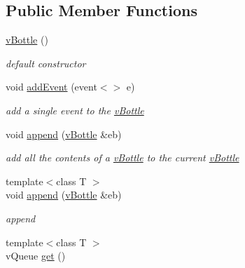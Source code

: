 \subsection*{Public Member Functions}
\begin{DoxyCompactItemize}
\item 
\hyperlink{classev_1_1vBottle_afb002196d4fa9bd19af48be74327cb17}{v\+Bottle} ()\hypertarget{classev_1_1vBottle_afb002196d4fa9bd19af48be74327cb17}{}\label{classev_1_1vBottle_afb002196d4fa9bd19af48be74327cb17}

\begin{DoxyCompactList}\small\item\em default constructor \end{DoxyCompactList}\item 
void \hyperlink{classev_1_1vBottle_a5b17f0b46d9260ab255f38382b4b7268}{add\+Event} (event$<$$>$ e)\hypertarget{classev_1_1vBottle_a5b17f0b46d9260ab255f38382b4b7268}{}\label{classev_1_1vBottle_a5b17f0b46d9260ab255f38382b4b7268}

\begin{DoxyCompactList}\small\item\em add a single event to the \hyperlink{classev_1_1vBottle}{v\+Bottle} \end{DoxyCompactList}\item 
void \hyperlink{classev_1_1vBottle_a0c78e6f9ef839038d71486f6a8a6294a}{append} (\hyperlink{classev_1_1vBottle}{v\+Bottle} \&eb)\hypertarget{classev_1_1vBottle_a0c78e6f9ef839038d71486f6a8a6294a}{}\label{classev_1_1vBottle_a0c78e6f9ef839038d71486f6a8a6294a}

\begin{DoxyCompactList}\small\item\em add all the contents of a \hyperlink{classev_1_1vBottle}{v\+Bottle} to the current \hyperlink{classev_1_1vBottle}{v\+Bottle} \end{DoxyCompactList}\item 
{\footnotesize template$<$class T $>$ }\\void \hyperlink{classev_1_1vBottle_a9ef66f613e1bbf196c515e7d8b0416df}{append} (\hyperlink{classev_1_1vBottle}{v\+Bottle} \&eb)\hypertarget{classev_1_1vBottle_a9ef66f613e1bbf196c515e7d8b0416df}{}\label{classev_1_1vBottle_a9ef66f613e1bbf196c515e7d8b0416df}

\begin{DoxyCompactList}\small\item\em append \end{DoxyCompactList}\item 
{\footnotesize template$<$class T $>$ }\\v\+Queue \hyperlink{classev_1_1vBottle_a86302277c279a1b02d92f8e12afe6a2c}{get} ()\hypertarget{classev_1_1vBottle_a86302277c279a1b02d92f8e12afe6a2c}{}\label{classev_1_1vBottle_a86302277c279a1b02d92f8e12afe6a2c}


\end{DoxyCompactItemize}
